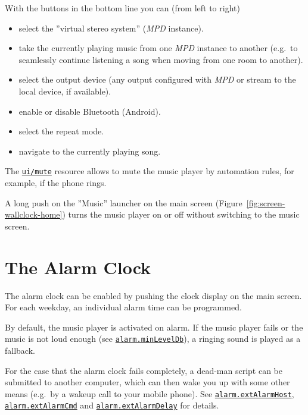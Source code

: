 \documentclass[12pt,english,parskip=half,headheight=19pt]{scrreprt}
\newcommand{\idx}[1]{#1\index{#1}}
\newcommand{\refenv}[1]{\hyperref[env:#1]{\texttt{#1}}}        %
\newcommand{\refrc}[1]{\hyperref[rc:#1]{\texttt{#1}}}
\begin{document}
With the buttons in the bottom line you can (from left to right)

\begin{itemize}
\item
  select the ''virtual stereo system'' (\textit{MPD} instance).
\item
  take the currently playing music from one \textit{MPD} instance to another
  (e.g.~to seamlessly continue listening a song when moving from one room to another).
\item
  select the output device (any output configured with \textit{MPD} or
  stream to the local device, if available).
\item
  enable or disable Bluetooth (Android).
\item
  select the repeat mode.
\item
  navigate to the currently playing song.
\end{itemize}

The \refrc{ui/mute} resource allows to mute the music player by automation
rules, for example, if the phone rings.

A long push on the ''Music'' launcher on the main screen (Figure~\ref{fig:screen-wallclock-home})
turns the music player on or off without switching to the music screen.



\section{The Alarm Clock}
\label{sec:wallclock-alarmclock}

The alarm clock can be enabled by pushing the clock display on the main screen.
For each weekday, an individual alarm time can be programmed.

By default, the music player is activated on alarm. If the music player fails
or the music is not loud enough (see \refenv{alarm.minLevelDb}), a ringing
sound is played as a fallback.

For the case that the alarm clock fails completely, a dead-man script can
be submitted to another computer, which can then wake you up with some
other means (e.g.~by a wakeup call to your mobile phone).
See \refenv{alarm.extAlarmHost}, \refenv{alarm.extAlarmCmd} and \refenv{alarm.extAlarmDelay}
for details.
\end{document}
